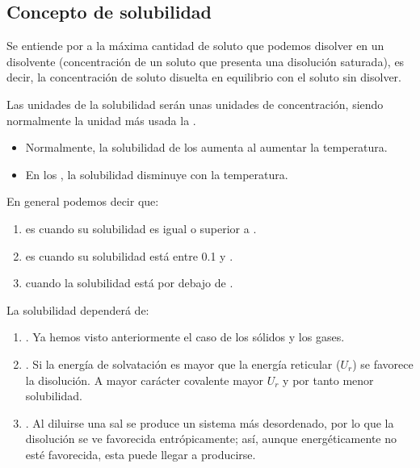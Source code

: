 \subsection{Concepto de solubilidad}\label{subsec:concepto-de-solubilidad}

\begin{center}
    \begin{definition}[Solubilidad]
        Se entiende por  a la máxima cantidad de soluto que podemos disolver en un disolvente (concentración de un soluto que presenta una disolución saturada), es decir, la concentración de soluto disuelta en equilibrio con el soluto sin disolver.

        Las unidades de la solubilidad serán unas unidades de concentración, siendo normalmente la unidad más usada la \si{{\M}}.
    \end{definition}
\end{center}


\begin{itemize}
    \item Normalmente, la solubilidad de los  aumenta al aumentar la temperatura.
    \item En los , la solubilidad disminuye con la temperatura.
\end{itemize}

En general podemos decir que:
\begin{enumerate}[label=\numberballmDarkTeal]
\item {} es cuando su solubilidad es igual o superior a .
\item {} es cuando su solubilidad está entre \num{0.1} y .
\item {} cuando la solubilidad está por debajo de .
\end{enumerate}
La solubilidad dependerá de:
\begin{enumerate}[label=\numberballmDarkTeal]
\item {}.
Ya hemos visto anteriormente el caso de los sólidos y los gases.
\item {}.
Si la energía de solvatación es mayor que la energía reticular (\(U_r\)) se favorece la disolución.
A mayor carácter covalente mayor \(U_r\) y por tanto menor solubilidad.
\item {}.
Al diluirse una sal se produce un sistema más desordenado, por lo que la disolución se ve favorecida entrópicamente; así, aunque energéticamente no esté favorecida, esta puede llegar a producirse.
\end{enumerate}

